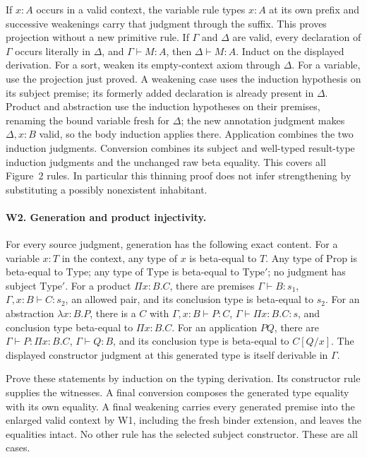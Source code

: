 If \(x:A\) occurs in a valid context, the variable rule types \(x:A\)
at its own prefix and successive weakenings carry that judgment through
the suffix. This proves projection without a new primitive rule.
If \(\Gamma\) and \(\Delta\) are valid, every declaration of
\(\Gamma\) occurs literally in \(\Delta\), and
\(\Gamma\vdash M:A\), then \(\Delta\vdash M:A\).
Induct on the displayed derivation. For a sort, weaken its empty-context
axiom through \(\Delta\). For a variable, use the projection just proved.
A weakening case uses the induction hypothesis on its subject premise;
its formerly added declaration is already present in \(\Delta\).
Product and abstraction use the induction hypotheses on their premises,
renaming the bound variable fresh for \(\Delta\); the new annotation
judgment makes \(\Delta,x:B\) valid, so the body induction applies
there. Application combines the two induction judgments. Conversion
combines its subject and well-typed result-type induction judgments and
the unchanged raw beta equality. This covers all Figure~2 rules.
In particular this thinning proof does not infer strengthening by
substituting a possibly nonexistent inhabitant.

\paragraph{W2. Generation and product injectivity.}
For every source judgment, generation has the following exact content.
For a variable \(x:T\) in the context, any type of \(x\) is
beta-equal to \(T\). Any type of \(\mathrm{Prop}\) is beta-equal to
\(\mathrm{Type}\); any type of \(\mathrm{Type}\) is beta-equal to
\(\mathrm{Type}'\); no judgment has subject \(\mathrm{Type}'\).
For a product \(\Pi x:B.C\), there are premises
\(\Gamma\vdash B:s_1\),
\(\Gamma,x:B\vdash C:s_2\), an allowed pair, and its conclusion type
is beta-equal to \(s_2\). For an abstraction \(\lambda x:B.P\),
there is a \(C\) with \(\Gamma,x:B\vdash P:C\),
\(\Gamma\vdash\Pi x:B.C:s\), and conclusion type beta-equal to
\(\Pi x:B.C\). For an application \(PQ\), there are
\(\Gamma\vdash P:\Pi x:B.C\), \(\Gamma\vdash Q:B\), and its
conclusion type is beta-equal to \(C[Q/x]\).
The displayed constructor judgment at this generated type is itself
derivable in \(\Gamma\).

Prove these statements by induction on the typing derivation. Its
constructor rule supplies the witnesses. A final conversion composes
the generated type equality with its own equality. A final weakening
carries every generated premise into the enlarged valid context by W1,
including the fresh binder extension, and leaves the equalities intact.
No other rule has the selected subject constructor. These are all cases.

